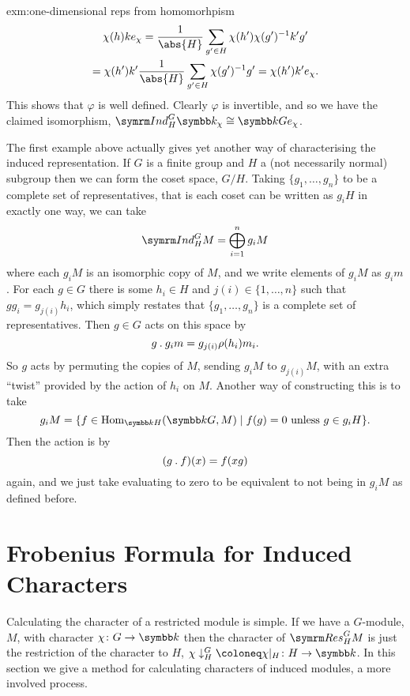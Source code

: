 \begin{exm}{}{exm:one-dimensional reps from homomorhpism}
    \begin{multline}
        \chi(h)ke_\chi = \frac{1}{\abs{H}} \sum_{g' \in H} \chi(h')\chi(g')^{-1}k'g'\\
        = \chi(h')k' \frac{1}{\abs{H}} \sum_{g' \in H} \chi(g')^{-1}g' = \chi(h')k'e_\chi.
    \end{multline}
    This shows that \(\varphi\) is well defined.
    Clearly \(\varphi\) is invertible, and so we have the claimed isomorphism, \(\Ind^G_H\field_{\chi} \isomorphic \field Ge_{\chi}\).
\end{exm}

The first example above actually gives yet another way of characterising the induced representation.
If \(G\) is a finite group and \(H\) a (not necessarily normal) subgroup then we can form the coset space, \(G/H\).
Taking \(\{g_1, \dotsc, g_n\}\) to be a complete set of representatives, that is each coset can be written as \(g_i H\) in exactly one way, we can take
\begin{equation}
    \Ind^G_H M = \bigoplus_{i=1}^n g_iM
\end{equation}
where each \(g_i M\) is an isomorphic copy of \(M\), and we write elements of \(g_i M\) as \(g_i m\).
For each \(g \in G\) there is some \(h_i \in H\) and \(j(i) \in \{1, \dotsc, n\}\) such that \(gg_i = g_{j(i)}h_i\), which simply restates that \(\{g_1, \dotsc, g_n\}\) is a complete set of representatives. 
Then \(g \in G\) acts on this space by
\begin{equation}
    g \mathbin{.} g_i m = g_{j(i)} \rho(h_i)m_i.
\end{equation}
So \(g\) acts by permuting the copies of \(M\), sending \(g_iM\) to \(g_{j(i)}M\), with an extra \enquote{twist} provided by the action of \(h_i\) on \(M\).
Another way of constructing this is to take
\begin{equation}
    g_i M = \{f \in \Hom_{\field H}(\field G, M) \mid f(g) = 0 \text{ unless } g \in g_i H\}.
\end{equation}
Then the action is by
\begin{equation}
    (g \mathbin{.} f)(x) = f(xg)
\end{equation}
again, and we just take evaluating to zero to be equivalent to not being in \(g_i M\) as defined before.

\section{Frobenius Formula for Induced Characters}
Calculating the character of a restricted module is simple.
If we have a \(G\)-module, \(M\), with character \(\chi \colon G \to \field\) then the character of \(\Res^G_HM\) is just the restriction of the character to \(H\), \(\chi\downarrow^G_H \coloneq \chi|_H \colon H \to \field\).
In this section we give a method for calculating characters of induced modules, a more involved process.

